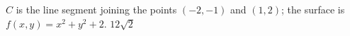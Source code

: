 {$C$ is the line segment joining the points $(-2,-1)$ and $(1,2)$; the surface is $f(x,y)=x^2+y^2+2$.
}
{$12\sqrt{2}$
}

